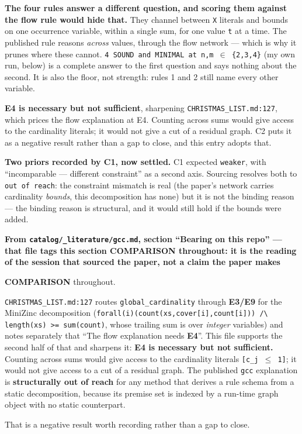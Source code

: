 \documentclass[10pt,a4paper]{article}
\newcommand{\provtag}[2]{{\small\sffamily\bfseries\textcolor{#1}{#2}}}
\newenvironment{calblock}{%
  \par\smallskip
  \def\FrameCommand{\textcolor{calbar}{\vrule width 1pt}\hspace{9pt}}%
  \MakeFramed{\advance\hsize-\width\FrameRestore}}%
  {\endMakeFramed\par\smallskip}
\newcommand{\litsubsub}[1]{\par{\sffamily\bfseries\small #1\par}}
\begin{document}
\begin{calblock}
\textbf{The four rules answer a different question, and scoring them against the flow rule would hide that.} They channel between \texttt{X} literals and bounds on one occurrence variable, within a single sum, for one value \texttt{t} at a time. The published rule reasons \emph{across} values, through the flow network --- which is why it prunes where these cannot. \texttt{4 SOUND and MINIMAL at n,m $\in$ \{2,3,4\}} (my own run, below) is a complete answer to the first question and says nothing about the second. It is also the floor, not strength: rules 1 and 2 still name every other variable.

\textbf{E4 is necessary but not sufficient}, sharpening \texttt{CHRISTMAS\_LIST.md:127}, which prices the flow explanation at E4. Counting across sums would give access to the cardinality literals; it would not give a cut of a residual graph. C2 puts it as a negative result rather than a gap to close, and this entry adopts that.

\textbf{Two priors recorded by C1, now settled.} C1 expected \texttt{weaker}, with ``incomparable --- different constraint'' as a second axis. Sourcing resolves both to \texttt{out of reach}: the constraint mismatch is real (the paper's network carries cardinality \emph{bounds}, this decomposition has none) but it is not the binding reason --- the binding reason is structural, and it would still hold if the bounds were added.

\litsubsub{From \texttt{catalog/\_\allowbreak{}literature/gcc.md}, section ``Bearing on this repo'' --- that file tags this section \provtag{tagcomparison}{COMPARISON} throughout: it is the reading of the session that sourced the paper, not a claim the paper makes}
\provtag{tagcomparison}{COMPARISON} throughout.

\texttt{CHRISTMAS\_LIST.md:127} routes \texttt{global\_cardinality} through \textbf{E3/E9} for the MiniZinc decomposition (\texttt{forall(i)(count(xs,cover[i],count[i])) /\allowbreak{}\textbackslash{} length(xs) >= sum(count)}, whose trailing sum is over \emph{integer} variables) and notes separately that ``The flow explanation needs \textbf{E4}''. This file supports the second half of that and sharpens it: \textbf{E4 is necessary but not sufficient.} Counting across sums would give access to the cardinality literals \texttt{[c\_j $\leq$ 1]}; it would not give access to a cut of a residual graph. The published \texttt{gcc} explanation is \textbf{structurally out of reach} for any method that derives a rule schema from a static decomposition, because its premise set is indexed by a run-time graph object with no static counterpart.

That is a negative result worth recording rather than a gap to close.

\par\smallskip
\end{calblock}
\end{document}
